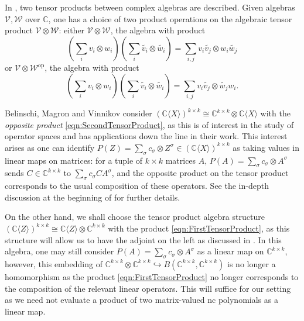 \documentclass[11pt,reqno]{amsart}
\def\s{\sigma}
\def\CC{\mathbb{C}}
\def\cV{\mathcal{V}}
\def\cW{\mathcal{W}}
\theoremstyle{definition}
\numberwithin{equation}{section}
\renewcommand{\tilde}{\widetilde}
\begin{document}
In \cite[Section 3]{BMV23}, two tensor products between complex algebras are described. Given algebras \(\cV, \cW\) over \(\CC\), one has a choice of two product operations on the algebraic tensor product \(\cV \otimes \cW\): either \(\cV \otimes \cW\), the algebra with product
\begin{equation}
    \label{eqn:FirstTensorProduct}
    \left(\sum_i v_i \otimes w_i\right)\left(\sum_i \tilde{v_i} \otimes \tilde{w_i}\right) = \sum_{i,j} v_i \tilde{v_j} \otimes w_i \tilde{w_j}
\end{equation}
or \(\cV \otimes \cW^{\mathrm{op}}\), the algebra with product
\begin{equation}
    \label{eqn:SecondTensorProduct}
    \left(\sum_i v_i \otimes w_i\right)\left(\sum_i \tilde{v_i} \otimes \tilde{w_i}\right) = \sum_{i,j} v_i \tilde{v_j} \otimes \tilde{w_j} w_i.
\end{equation}

Belinschi, Magron and Vinnikov consider \((\CC\langle X \rangle)^{k \times k} \cong \CC^{k \times k} \otimes \CC\langle X \rangle\) with the \emph{opposite product} \eqref{eqn:SecondTensorProduct}, as this is of interest in the study of operator spaces and has applications down the line in their work. This interest arises as one can identify \(P(Z) = \sum_{\s} c_\s \otimes Z^{\s} \in (\CC\langle X \rangle)^{k\times k}\) as taking values in linear maps on matrices: for a tuple of \(k\times k\) matrices \(A\), \(P(A) = \sum_\s c_\s \otimes A^{\s}\) sends \(C \in \CC^{k\times k}\) to \(\sum_\s c_\s C A^{\s}\), and the opposite product on the tensor product corresponds to the usual composition of these operators. See the in-depth discussion at the beginning of \cite[Section 3.2]{BMV23} for further details.

On the other hand, we shall choose the tensor product algebra structure \((\CC\langle Z \rangle)^{k\times k} \cong \CC \langle Z \rangle \otimes \CC^{k\times k}\) with the product \eqref{eqn:FirstTensorProduct}, as this structure will allow us to have the adjoint on the left as discussed in . In this algebra, one may still consider \(P(A) = \sum_\s c_\s \otimes A^{\s}\) as a linear map on \(\CC^{k\times k}\), however, this embedding of \(\CC^{k\times k} \otimes \CC^{k\times k} \hookrightarrow B(\CC^{k\times k}, \CC^{k\times k})\) is no longer a homomorphism as the product \eqref{eqn:FirstTensorProduct} no longer corresponds to the composition of the relevant linear operators. This will suffice for our setting as we need not evaluate a product of two matrix-valued nc polynomials as a linear map.
\end{document}
